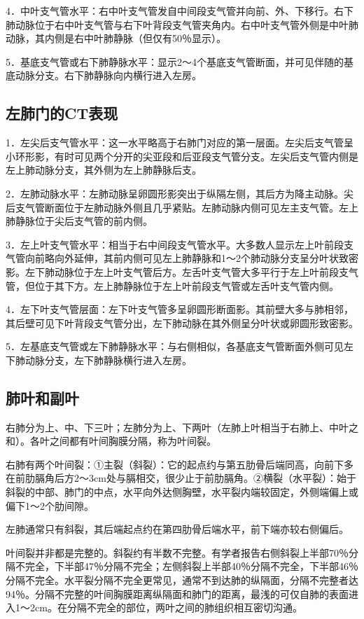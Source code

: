 4．中叶支气管水平：右中叶支气管发自中间段支气管并向前、外、下移行。右下肺动脉位于右中叶支气管与右下叶背段支气管夹角内。右中叶支气管外侧是中叶肺动脉，其内侧是右中叶肺静脉（但仅有50％显示）。

5．基底支气管或右下肺静脉水平：显示2～4个基底支气管断面，并可见伴随的基底动脉分支。右下肺静脉向内横行进入左房。

\subsection{左肺门的CT表现}

1．左尖后支气管水平：这一水平略高于右肺门对应的第一层面。左尖后支气管呈小环形影，有时可见两个分开的尖亚段和后亚段支气管分支。左尖后支气管内侧是左上肺动脉分支，其外侧为左上肺静脉后支。

2．左肺动脉水平：左肺动脉呈卵圆形影突出于纵隔左侧，其后方为降主动脉。尖后支气管断面位于左肺动脉外侧且几乎紧贴。左肺动脉内侧可见左主支气管。左上肺静脉位于尖后支气管的前内侧。

3．左上叶支气管水平：相当于右中间段支气管水平。大多数人显示左上叶前段支气管向前略向外延伸，其前内侧可见左上肺静脉和1～2个肺动脉分支呈分叶状致密影。左下肺动脉位于左上叶支气管后方。左舌叶支气管大多平行于左上叶前段支气管，但位于其下方。左上肺静脉位于左上叶前段支气管或左舌叶支气管内侧。

4．左下叶支气管层面：左下叶支气管多呈卵圆形断面影。其前壁大多与肺相邻，其后壁可见下叶背段支气管分出，左下肺动脉在其外侧呈分叶状或卵圆形致密影。

5．左基底支气管或左下肺静脉水平：与右侧相似，各基底支气管断面外侧可见左下肺动脉分支，左下肺静脉横行进入左房。

\subsection{肺叶和副叶}

右肺分为上、中、下三叶；左肺分为上、下两叶（左肺上叶相当于右肺上、中叶之和）。各叶之间都有叶间胸膜分隔，称为叶间裂。

右肺有两个叶间裂：①主裂（斜裂）：它的起点约与第五肋骨后端同高，向前下多在前肋膈角后方2～3cm处与膈相交，很少止于前肋膈角。②横裂（水平裂）：始于斜裂的中部、肺门的中点，水平向外达侧胸壁，水平裂内端较固定，外侧端偏上或偏下1～2个肋间隙。

左肺通常只有斜裂，其后端起点约在第四肋骨后端水平，前下端亦较右侧偏后。

叶间裂并非都是完整的。斜裂约有半数不完整。有学者报告右侧斜裂上半部70％分隔不完全，下半部47％分隔不完全；左侧斜裂上半部40％分隔不完全，下半部46％分隔不完全。水平裂分隔不完全更常见，通常不到达肺的纵隔面，分隔不完整者达94％。分隔不完整的叶间胸膜距离纵隔面和肺门的距离，最浅的可仅自肺的表面进入1～2cm。在分隔不完全的部位，两叶之间的肺组织相互密切沟通。

